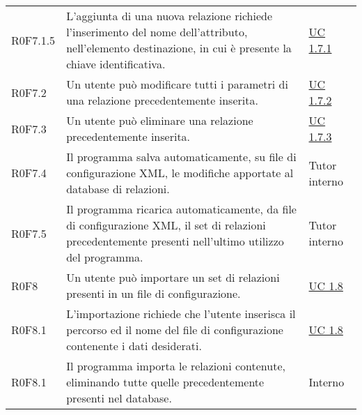 \begin{center}
\begin{longtable}{p{4.2cm}!{\color{white}\vrule width 0.5mm}p{6cm}!{\color{white}\vrule width 0.5mm}p{2.5cm}!{\color{white}\vrule width 0.5mm}}
				\hspace{4mm}\hypertarget{XER0F7.1.5}{R0F7.1.5} & L'aggiunta di una nuova relazione richiede l'inserimento del nome dell'attributo, nell'elemento destinazione, in cui è presente la chiave identificativa. & \hyperref[subsec:XEUC1.7.1]{UC 1.7.1}\\	
				
			
			\hspace{2mm}\hypertarget{XER0F7.2}{R0F7.2} & Un utente può modificare tutti i parametri di una relazione precedentemente inserita. & \hyperref[subsec:XEUC1.7.2]{UC 1.7.2}\\
		
			\hspace{2mm}\hypertarget{XER0F7.3}{R0F7.3} & Un utente può eliminare una relazione precedentemente inserita. & \hyperref[subsec:XEUC1.7.3]{UC 1.7.3}\\
		
			\hspace{2mm}\hypertarget{XER0F7.4}{R0F7.4} & Il programma salva automaticamente, su file di configurazione XML, le modifiche apportate al database di relazioni. & Tutor interno\\
		
			\hspace{2mm}\hypertarget{XER0F7.5}{R0F7.5} & Il programma ricarica automaticamente, da file di configurazione XML, il set di relazioni precedentemente presenti nell'ultimo utilizzo del programma. & Tutor interno\\
			
		
		\hspace{0mm}\hypertarget{XER0F8}{R0F8} & Un utente può importare un set di relazioni presenti in un file di configurazione. & \hyperref[subsec:XEUC1.8]{UC 1.8}\\
		
			\hspace{2mm}\hypertarget{XER0F8.1}{R0F8.1} & L'importazione richiede che l'utente inserisca il percorso ed il nome del file di configurazione contenente i dati desiderati. & \hyperref[subsec:XEUC1.8]{UC 1.8}\\
			
			\hspace{2mm}\hypertarget{XER0F8.1}{R0F8.1} & Il programma importa le relazioni contenute, eliminando tutte quelle precedentemente presenti nel database. & Interno\\
		

\end{longtable}
\end{center}
